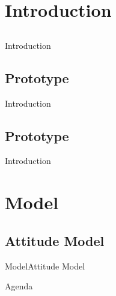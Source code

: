 \section{Introduction}

\subsection{}
\begin{frame}{Introduction}{}

\end{frame}

\subsection{Prototype}
\begin{frame}{Introduction}{}
    \
\end{frame}

\subsection{Prototype}
\begin{frame}{Introduction}{}
    
\end{frame}

\section{Model}
\subsection{Attitude Model}
\begin{frame}{Model}{Attitude Model}
\end{frame}

\begin{frame}{Agenda}{}
    \tableofcontents
\end{frame}

